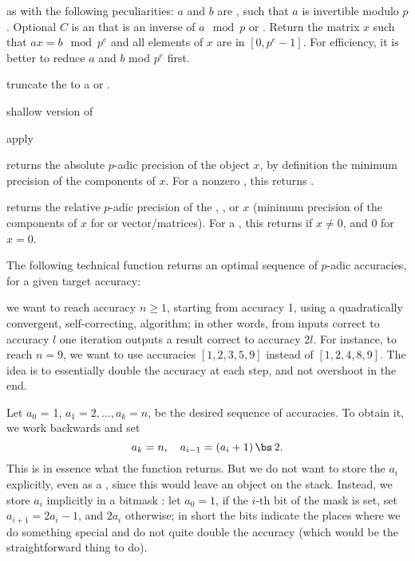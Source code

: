  as 
with the following peculiarities: $a$ and $b$ are , such that $a$ is
invertible modulo $p$. Optional $C$ is an  that is an inverse of
$a\mod p$ or . Return the matrix $x$ such that $ax=b\mod p^e$ and
all elements of $x$ are in $[0,p^e-1]$. For efficiency, it is better
to reduce $a$ and $b$ mod $p^e$ first.

 truncate the  to a  or
.

 shallow version of 

 apply 

 returns the absolute $p$-adic precision of
the object $x$, by definition the minimum precision of the components of $x$.
For a nonzero , this returns .

 returns the relative $p$-adic
precision of the , , or  $x$ (minimum precision
of the components of $x$ for  or vector/matrices).
For a , this returns  if $x\neq0$, and $0$ for $x=0$.


The following technical function returns an optimal sequence of $p$-adic
accuracies, for a given target accuracy:

 we want to reach accuracy
$n\geq 1$, starting from accuracy 1, using a quadratically convergent,
self-correcting, algorithm; in other words, from inputs correct to accuracy
$l$ one iteration outputs a result correct to accuracy $2l$.
For instance, to reach $n = 9$, we want to use accuracies
$[1,2,3,5,9]$ instead of $[1,2,4,8,9]$. The idea is to essentially double
the accuracy at each step, and not overshoot in the end.

Let $a_0$ = 1, $a_1 = 2, \ldots, a_k = n$, be the desired sequence of
accuracies. To obtain it, we work backwards and set
$$ a_k = n,\quad a_{i-1} = (a_i + 1)\,\bs\, 2.$$
This is in essence what the function returns.
But we do not want to store the $a_i$ explicitly, even as a ,
since this would leave an object on the stack. Instead, we store $a_i$
implicitly in a bitmask : let $a_0 = 1$, if the $i$-th bit of the
mask is set, set $a_{i+1} = 2a_i - 1$, and $2a_i$ otherwise; in short the
bits indicate the places where we do something special and do not quite
double the accuracy (which would be the straightforward thing to do).

